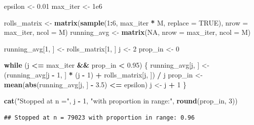 \documentclass[
]{article}
\newenvironment{Shaded}{\begin{snugshade}}{\end{snugshade}}
\newcommand{\AttributeTok}[1]{\textcolor[rgb]{0.13,0.29,0.53}{#1}}
\newcommand{\ConstantTok}[1]{\textcolor[rgb]{0.56,0.35,0.01}{#1}}
\newcommand{\ControlFlowTok}[1]{\textcolor[rgb]{0.13,0.29,0.53}{\textbf{#1}}}
\newcommand{\DecValTok}[1]{\textcolor[rgb]{0.00,0.00,0.81}{#1}}
\newcommand{\FloatTok}[1]{\textcolor[rgb]{0.00,0.00,0.81}{#1}}
\newcommand{\FunctionTok}[1]{\textcolor[rgb]{0.13,0.29,0.53}{\textbf{#1}}}
\newcommand{\NormalTok}[1]{#1}
\newcommand{\OtherTok}[1]{\textcolor[rgb]{0.56,0.35,0.01}{#1}}
\newcommand{\SpecialCharTok}[1]{\textcolor[rgb]{0.81,0.36,0.00}{\textbf{#1}}}
\newcommand{\StringTok}[1]{\textcolor[rgb]{0.31,0.60,0.02}{#1}}
\begin{document}
\begin{Shaded}
\begin{Highlighting}[]
\NormalTok{epsilon }\OtherTok{\textless{}{-}} \FloatTok{0.01}
\NormalTok{max\_iter }\OtherTok{\textless{}{-}} \FloatTok{1e6}

\NormalTok{rolls\_matrix }\OtherTok{\textless{}{-}} \FunctionTok{matrix}\NormalTok{(}\FunctionTok{sample}\NormalTok{(}\DecValTok{1}\SpecialCharTok{:}\DecValTok{6}\NormalTok{, max\_iter }\SpecialCharTok{*}\NormalTok{ M, }\AttributeTok{replace =} \ConstantTok{TRUE}\NormalTok{), }\AttributeTok{nrow =}\NormalTok{ max\_iter, }\AttributeTok{ncol =}\NormalTok{ M)}
\NormalTok{running\_avg }\OtherTok{\textless{}{-}} \FunctionTok{matrix}\NormalTok{(}\ConstantTok{NA}\NormalTok{, }\AttributeTok{nrow =}\NormalTok{ max\_iter, }\AttributeTok{ncol =}\NormalTok{ M)}

\NormalTok{running\_avg[}\DecValTok{1}\NormalTok{, ] }\OtherTok{\textless{}{-}}\NormalTok{ rolls\_matrix[}\DecValTok{1}\NormalTok{, ]}
\NormalTok{j }\OtherTok{\textless{}{-}} \DecValTok{2}
\NormalTok{prop\_in }\OtherTok{\textless{}{-}} \DecValTok{0}

\ControlFlowTok{while}\NormalTok{ (j }\SpecialCharTok{\textless{}=}\NormalTok{ max\_iter }\SpecialCharTok{\&\&}\NormalTok{ prop\_in }\SpecialCharTok{\textless{}} \FloatTok{0.95}\NormalTok{) \{}
\NormalTok{  running\_avg[j, ] }\OtherTok{\textless{}{-}}\NormalTok{ (running\_avg[j }\SpecialCharTok{{-}} \DecValTok{1}\NormalTok{, ] }\SpecialCharTok{*}\NormalTok{ (j }\SpecialCharTok{{-}} \DecValTok{1}\NormalTok{) }\SpecialCharTok{+}\NormalTok{ rolls\_matrix[j, ]) }\SpecialCharTok{/}\NormalTok{ j}
\NormalTok{  prop\_in }\OtherTok{\textless{}{-}} \FunctionTok{mean}\NormalTok{(}\FunctionTok{abs}\NormalTok{(running\_avg[j, ] }\SpecialCharTok{{-}} \FloatTok{3.5}\NormalTok{) }\SpecialCharTok{\textless{}=}\NormalTok{ epsilon)}
\NormalTok{  j }\OtherTok{\textless{}{-}}\NormalTok{ j }\SpecialCharTok{+} \DecValTok{1}
\NormalTok{\}}

\FunctionTok{cat}\NormalTok{(}\StringTok{"Stopped at n ="}\NormalTok{, j }\SpecialCharTok{{-}} \DecValTok{1}\NormalTok{, }\StringTok{"with proportion in range:"}\NormalTok{, }\FunctionTok{round}\NormalTok{(prop\_in, }\DecValTok{3}\NormalTok{))}
\end{Highlighting}
\end{Shaded}

\begin{verbatim}
## Stopped at n = 79023 with proportion in range: 0.96
\end{verbatim}
\end{document}
